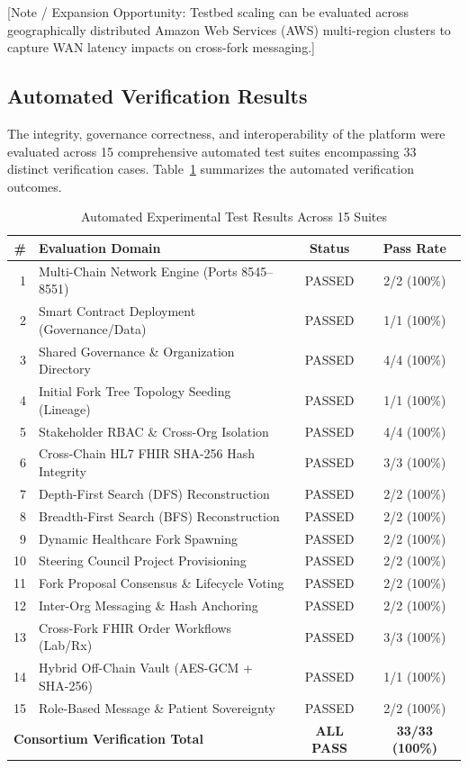 [Note / Expansion Opportunity: Testbed scaling can be evaluated across geographically distributed Amazon Web Services (AWS) multi-region clusters to capture WAN latency impacts on cross-fork messaging.]

\subsection{Automated Verification Results}
The integrity, governance correctness, and interoperability of the platform were evaluated across 15 comprehensive automated test suites encompassing 33 distinct verification cases. Table~\ref{tab:test_results} summarizes the automated verification outcomes.

\begin{table}[htbp]
\centering
\caption{Automated Experimental Test Results Across 15 Suites}
\label{tab:test_results}
\footnotesize
\setlength{\tabcolsep}{2.5pt}
\begin{tabularx}{\columnwidth}{rXcc}
\toprule
\textbf{\#} & \textbf{Evaluation Domain} & \textbf{Status} & \textbf{Pass Rate} \\
\midrule
1  & Multi-Chain Network Engine (Ports 8545--8551) & PASSED & 2/2 (100\%) \\
2  & Smart Contract Deployment (Governance/Data)   & PASSED & 1/1 (100\%) \\
3  & Shared Governance \& Organization Directory   & PASSED & 4/4 (100\%) \\
4  & Initial Fork Tree Topology Seeding (Lineage)  & PASSED & 1/1 (100\%) \\
5  & Stakeholder RBAC \& Cross-Org Isolation       & PASSED & 4/4 (100\%) \\
6  & Cross-Chain HL7 FHIR SHA-256 Hash Integrity   & PASSED & 3/3 (100\%) \\
7  & Depth-First Search (DFS) Reconstruction       & PASSED & 2/2 (100\%) \\
8  & Breadth-First Search (BFS) Reconstruction     & PASSED & 2/2 (100\%) \\
9  & Dynamic Healthcare Fork Spawning              & PASSED & 2/2 (100\%) \\
10 & Steering Council Project Provisioning          & PASSED & 2/2 (100\%) \\
11 & Fork Proposal Consensus \& Lifecycle Voting   & PASSED & 2/2 (100\%) \\
12 & Inter-Org Messaging \& Hash Anchoring         & PASSED & 2/2 (100\%) \\
13 & Cross-Fork FHIR Order Workflows (Lab/Rx)      & PASSED & 3/3 (100\%) \\
14 & Hybrid Off-Chain Vault (AES-GCM + SHA-256)    & PASSED & 1/1 (100\%) \\
15 & Role-Based Message \& Patient Sovereignty     & PASSED & 2/2 (100\%) \\
\midrule
\multicolumn{2}{l}{\textbf{Consortium Verification Total}} & \textbf{ALL PASS} & \textbf{33/33 (100\%)} \\
\bottomrule
\end{tabularx}
\end{table}

